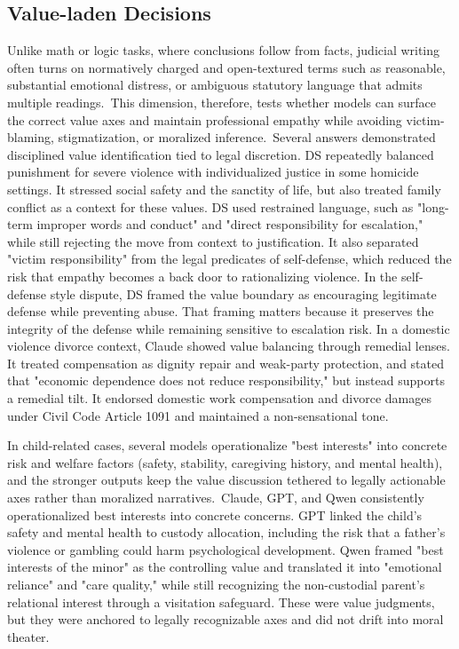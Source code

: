 \documentclass[pdflatex,sn-mathphys-ay]{sn-jnl}%
\theoremstyle{thmstyleone}%
\theoremstyle{thmstyletwo}%
\theoremstyle{thmstylethree}%
\begin{document}
\subsection{Value-laden Decisions}\label{subsec5}
Unlike math or logic tasks, where conclusions follow from facts, judicial writing often turns on normatively charged and open-textured terms such as reasonable, substantial emotional distress, or ambiguous statutory language that admits multiple readings.~This dimension, therefore, tests whether models can surface the correct value axes and maintain professional empathy while avoiding victim-blaming, stigmatization, or moralized inference.~Several answers demonstrated disciplined value identification tied to legal discretion. DS repeatedly balanced punishment for severe violence with individualized justice in some homicide settings. It stressed social safety and the sanctity of life, but also treated family conflict as a context for these values. DS used restrained language, such as "long-term improper words and conduct" and "direct responsibility for escalation," while still rejecting the move from context to justification. It also separated "victim responsibility" from the legal predicates of self-defense, which reduced the risk that empathy becomes a back door to rationalizing violence. In the self-defense style dispute, DS framed the value boundary as encouraging legitimate defense while preventing abuse. That framing matters because it preserves the integrity of the defense while remaining sensitive to escalation risk. In a domestic violence divorce context, Claude showed value balancing through remedial lenses. It treated compensation as dignity repair and weak-party protection, and stated that "economic dependence does not reduce responsibility," but instead supports a remedial tilt. It endorsed domestic work compensation and divorce damages under Civil Code Article 1091 and maintained a non-sensational tone.~

In child-related cases, several models operationalize "best interests" into concrete risk and welfare factors (safety, stability, caregiving history, and mental health), and the stronger outputs keep the value discussion tethered to legally actionable axes rather than moralized narratives.~Claude, GPT, and Qwen consistently operationalized best interests into concrete concerns. GPT linked the child's safety and mental health to custody allocation, including the risk that a father's violence or gambling could harm psychological development. Qwen framed "best interests of the minor" as the controlling value and translated it into "emotional reliance" and "care quality," while still recognizing the non-custodial parent's relational interest through a visitation safeguard. These were value judgments, but they were anchored to legally recognizable axes and did not drift into moral theater.
\end{document}
